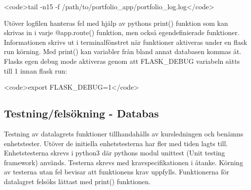 \documentclass{TDP003mall}
\begin{document}
<code>tail -n15 -f /path/to/portfolio\_app/portfolio\_log.log</code>

Utöver logfilen hanteras fel med hjälp av pythons print() funktion som kan skrivas in i varje @app.route() funktion, men också egendefinierade funktioner. Informationen skrivs ut i terminalfönstret när funktioner aktiveras under en flask run körning. Med print() kan variabler från bland annat databasen kommas åt. Flasks egen debug mode aktiveras genom att FLASK\_DEBUG variabeln sätts till 1 innan flask run:

<code>export FLASK\_DEBUG=1</code>

\subsection{Testning/felsökning - Databas}
Testning av datalagrets funktioner tillhandahålls av kursledningen och benämns enhetstester. Utöver de initiella enhetstesterna har fler med tiden lagts till. Enhetstesterna skrevs i python3 där pythons modul unittest (Unit testing framework) används. Testerna skrevs med kravspecifikationen i åtanke. Körning av testerna utan fel bevisar att funktionens krav uppfylls. Funktionerna för datalagret felsöks lättast med print() funktionen.
\end{document}
